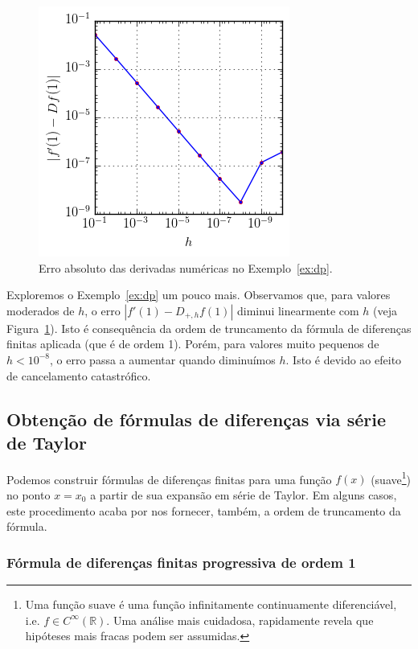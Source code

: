 \begin{figure}
  \centering
  \includegraphics{./cap_derivacao/pics/ex_derivacao/ex_derivacao}
  \caption{Erro absoluto das derivadas numéricas no Exemplo~\ref{ex:dp}.}
  \label{fig:ex_derivacao}
\end{figure}

Exploremos o Exemplo~\ref{ex:dp} um pouco mais. Observamos que, para valores moderados de $h$, o erro $|f'(1)-D_{+,h}f(1)|$ diminui linearmente com $h$ (veja Figura~\ref{fig:ex_derivacao}). Isto é consequência da ordem de truncamento da fórmula de diferenças finitas aplicada (que é de ordem 1). Porém, para valores muito pequenos de $h < 10^{-8}$, o erro passa a aumentar quando diminuímos $h$. Isto é devido ao efeito de cancelamento catastrófico.

\subsection{Obtenção de fórmulas de diferenças via série de Taylor}

Podemos construir fórmulas de diferenças finitas para uma função $f(x)$ (suave\footnote{Uma função suave é uma função infinitamente continuamente diferenciável, i.e. $f\in C^\infty(\mathbb{R})$. Uma análise mais cuidadosa, rapidamente revela que hipóteses mais fracas podem ser assumidas.}) no ponto $x = x_0$ a partir de sua expansão em série de Taylor. Em alguns casos, este procedimento acaba por nos fornecer, também, a ordem de truncamento da fórmula.

\subsubsection{Fórmula de diferenças finitas progressiva de ordem 1}

